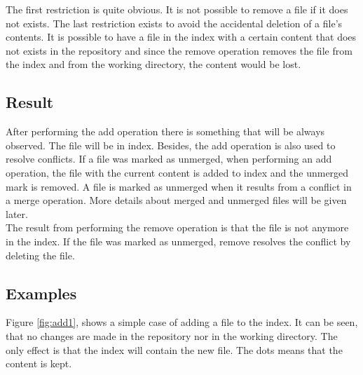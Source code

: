 The first restriction is quite obvious. It is not possible to remove
a file if it does not exists. The last restriction exists to avoid
the accidental deletion of a file's contents. It is possible to have a
file in the index with a certain content that does not exists in the
repository and since the remove operation removes the file from the index
and from the working directory, the content would be lost.  

\subsection{Result}
After performing the add operation there is something that will be
always observed. The file will be in index. Besides, the add operation 
is also used to resolve conflicts. If a file was
marked as unmerged, when performing an add operation, the file with 
the current content is added to index and the unmerged mark is removed. 
A file is marked as unmerged when it results from a conflict in a 
merge operation. More details about merged and unmerged files will be given later.\\


The result from performing the remove operation is that the file is
not anymore in the index. If the file was marked as unmerged, 
remove resolves the conflict by deleting the file.

\subsection{Examples}
Figure \ref{fig:add1}, shows a simple case of adding a file to the 
index. It can be seen, that no changes are made in the repository nor in the working
directory. The only effect is that the index will contain the new
file. The dots means that the content is kept.\\

